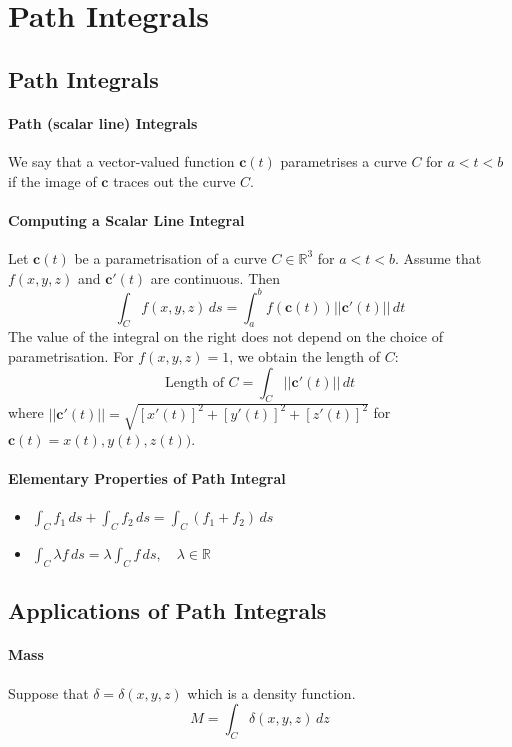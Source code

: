 
\section{Path Integrals}
\subsection{Path Integrals}
\paragraph{Path (scalar line) Integrals}
We say that a vector-valued function \(\textbf{c}(t)\) parametrises a curve \(C\) for \(a < t < b\) if the image of \(\textbf{c}\) traces out the curve \(C\). 

\paragraph{Computing a Scalar Line Integral}
Let \(\textbf{c}(t)\) be a parametrisation of a curve \(C \in \mathbb R^3\) for \(a < t < b\). Assume that \(f(x,y,z)\) and \(\textbf{c}'(t)\) are continuous. Then 
\[\int_C f(x,y,z) \, ds = \int_a^b f(\textbf{c}(t))||\textbf{c}'(t)|| \, dt \]
The value of the integral on the right does not depend on the choice of parametrisation. For \(f(x,y,z) = 1\), we obtain the length of \(C\):
\[\text{Length of } C = \int_C ||\textbf{c}'(t)|| \, dt\]
where \(||\textbf{c}'(t)|| = \sqrt{[x'(t)]^2 + [y'(t)]^2 + [z'(t)]^2}\) for \(\textbf{c}(t) = x(t), y(t), z(t))\).

\paragraph{Elementary Properties of Path Integral}
\begin{itemize}
    \item \(\int_C f_1 \, ds + \int_C f_2 \, ds = \int_C (f_1 + f_2) \, ds\)
    \item \(\int_C \lambda f \, ds = \lambda \int_C f \, ds, \quad \lambda \in \mathbb R\)
\end{itemize}

\subsection{Applications of Path Integrals}
\paragraph{Mass}
Suppose that \(\delta = \delta(x,y,z)\) which is a density function.
\[M = \int_C \delta(x,y,z) \, dz\]
